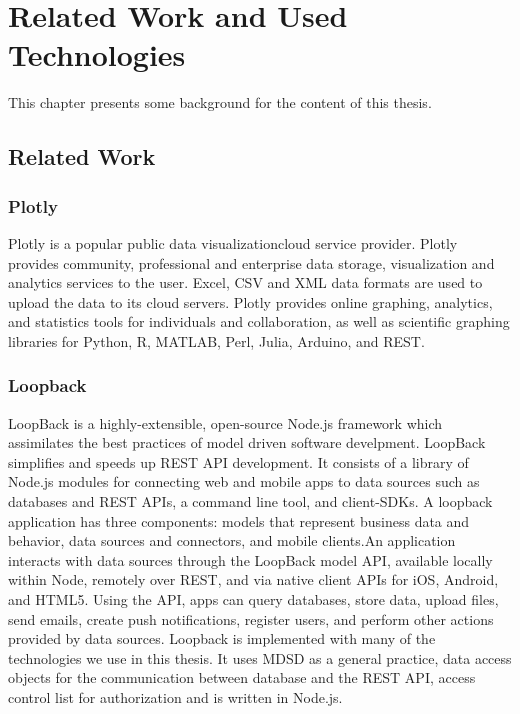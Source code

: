 
\chapter{Related Work and Used Technologies} %

\label{chapter2_bg}
This chapter presents some background for the content of this thesis.

\section{Related Work}

\subsection{Plotly}
Plotly is a popular public data visualizationcloud service provider. Plotly provides community, professional and enterprise data storage, visualization and analytics services to the user.  Excel, CSV and XML data formats are used to upload the data to its cloud servers.  Plotly provides online graphing, analytics, and statistics tools for individuals and collaboration, as well as scientific graphing libraries for Python, R, MATLAB, Perl, Julia, Arduino, and REST.

\subsection{Loopback}
LoopBack is a highly-extensible, open-source Node.js framework which assimilates the best practices of model driven software develpment. LoopBack simplifies and speeds up REST API development. It consists of a library of Node.js modules for connecting web and mobile apps to data sources such as databases and REST APIs, a command line tool, and client-SDKs. A loopback application has three components: models that represent business data and behavior, data sources and connectors, and mobile clients.An application interacts with data sources through the LoopBack model API, available locally within Node, remotely over REST, and via native client APIs for iOS, Android, and HTML5. Using the API, apps can query databases, store data, upload files, send emails, create push notifications, register users, and perform other actions provided by data sources.
	Loopback is implemented with many of the technologies we use in this thesis. It uses MDSD as a general practice, data access objects for the communication between database and the REST API, access control list for  authorization and is written in Node.js.

